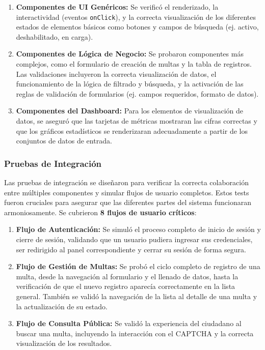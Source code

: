 \begin{enumerate}
    \item \textbf{Componentes de UI Genéricos:} Se verificó el renderizado, la interactividad (eventos \texttt{onClick}), y la correcta visualización de los diferentes estados de elementos básicos como botones y campos de búsqueda (ej. activo, deshabilitado, en carga).
    
    \item \textbf{Componentes de Lógica de Negocio:} Se probaron componentes más complejos, como el formulario de creación de multas y la tabla de registros. Las validaciones incluyeron la correcta visualización de datos, el funcionamiento de la lógica de filtrado y búsqueda, y la activación de las reglas de validación de formularios (ej. campos requeridos, formato de datos).
    
    \item \textbf{Componentes del Dashboard:} Para los elementos de visualización de datos, se aseguró que las tarjetas de métricas mostraran las cifras correctas y que los gráficos estadísticos se renderizaran adecuadamente a partir de los conjuntos de datos de entrada.
\end{enumerate}

\subsubsection{Pruebas de Integración}

Las pruebas de integración se diseñaron para verificar la correcta colaboración entre múltiples componentes y simular flujos de usuario completos. Estos tests fueron cruciales para asegurar que las diferentes partes del sistema funcionaran armoniosamente. Se cubrieron \textbf{8 flujos de usuario críticos}:

\begin{enumerate}
    \item \textbf{Flujo de Autenticación:} Se simuló el proceso completo de inicio de sesión y cierre de sesión, validando que un usuario pudiera ingresar sus credenciales, ser redirigido al panel correspondiente y cerrar su sesión de forma segura.
    
    \item \textbf{Flujo de Gestión de Multas:} Se probó el ciclo completo de registro de una multa, desde la navegación al formulario y el llenado de datos, hasta la verificación de que el nuevo registro aparecía correctamente en la lista general. También se validó la navegación de la lista al detalle de una multa y la actualización de su estado.
    
    \item \textbf{Flujo de Consulta Pública:} Se validó la experiencia del ciudadano al buscar una multa, incluyendo la interacción con el CAPTCHA y la correcta visualización de los resultados.
\end{enumerate}

